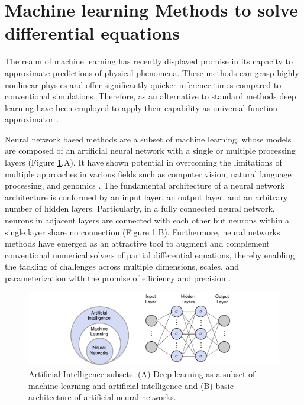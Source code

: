 \documentclass[11pt,twoside]{article}
\begin{document}
\section{Machine learning Methods to solve differential equations}\label{sec:dl_mwpm}

The realm of machine learning has recently displayed promise in its capacity to approximate predictions of physical phenomena. These methods 
can grasp highly nonlinear physics and offer significantly quicker inference times compared to conventional simulations. Therefore, as an 
alternative to standard methods deep learning have been employed to apply their capability as universal function approximator 
\citep{hornik_approximation_1991}.

Neural network based methods are a subset of machine learning, whose models are composed of an artificial neural network with a single 
or multiple processing layers (Figure \ref{deep_learning_subset_architecture}.A). It have shown potential in overcoming the limitations 
of multiple approaches in various fields such as computer vision, natural language processing, and genomics 
\citep{lecun_deep_2015,goodfellow_deep_2016}. The fundamental architecture of a neural network architecture is conformed by an input 
layer, an output layer, and an arbitrary number of hidden layers. Particularly, in a fully connected neural network, neurons in adjacent 
layers are connected with each other but neurons within a single layer share no connection (Figure \ref{deep_learning_subset_architecture}.B). 
Furthermore, neural networks methods have emerged as an attractive tool to augment and complement conventional numerical solvers of partial 
differential equations, thereby enabling the tackling of challenges across multiple dimensions, scales, and parameterization with the promise 
of efficiency and precision \citep{blechschmidt_three_2021}. 

\begin{figure}[H]
\centering
    \includegraphics[width=1.0\textwidth]{figs/Artificial_Intelligence_subsets.pdf}
    \caption{Artificial Intelligence subsets. (A) Deep learning as a subset of machine learning and artificial intelligence and (B) basic 
    architecture of artificial neural networks.}    
    \label{deep_learning_subset_architecture}
\end{figure}
\end{document}
